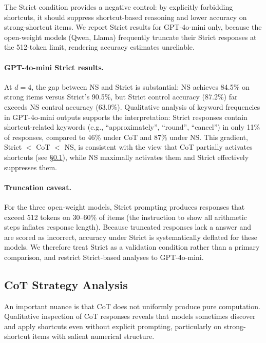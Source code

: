 The Strict condition provides a negative control: by explicitly forbidding shortcuts, it should suppress shortcut-based reasoning and lower accuracy on strong-shortcut items.
We report Strict results for GPT-4o-mini only, because the open-weight models (Qwen, Llama) frequently truncate their Strict responses at the 512-token limit, rendering accuracy estimates unreliable.

\paragraph{GPT-4o-mini Strict results.}
At $d{=}4$, the gap between NS and Strict is substantial: NS achieves 84.5\% on strong items versus Strict's 90.5\%, but Strict control accuracy (87.2\%) far exceeds NS control accuracy (63.0\%).
Qualitative analysis of keyword frequencies in GPT-4o-mini outputs supports the interpretation: Strict responses contain shortcut-related keywords (e.g., ``approximately'', ``round'', ``cancel'') in only 11\% of responses, compared to 46\% under CoT and 87\% under NS.
This gradient, Strict $<$ CoT $<$ NS, is consistent with the view that CoT partially activates shortcuts (see \S\ref{sec:cot_strategy}), while NS maximally activates them and Strict effectively suppresses them.

\paragraph{Truncation caveat.}
For the three open-weight models, Strict prompting produces responses that exceed 512 tokens on 30--60\% of items (the instruction to show all arithmetic steps inflates response length).
Because truncated responses lack a \boxed{} answer and are scored as incorrect, accuracy under Strict is systematically deflated for these models.
We therefore treat Strict as a validation condition rather than a primary comparison, and restrict Strict-based analyses to GPT-4o-mini.

\subsection{CoT Strategy Analysis}
\label{sec:cot_strategy}

An important nuance is that CoT does not uniformly produce pure computation.
Qualitative inspection of CoT responses reveals that models sometimes discover and apply shortcuts even without explicit prompting, particularly on strong-shortcut items with salient numerical structure.

